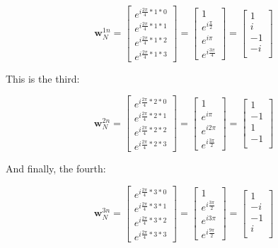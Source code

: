 \documentclass[
  letterpaper,
]{krantz}
\begin{document}
\[
\mathbf{w}^{1n}_N
=
\begin{bmatrix}
   e^{i\frac{2 \pi}{4}* 1 * 0}\\
   e^{i\frac{2 \pi}{4}* 1 * 1}\\
   e^{i\frac{2 \pi}{4}* 1 * 2}\\
   e^{i\frac{2 \pi}{4}* 1 * 3}
\end{bmatrix}
=
\begin{bmatrix}
   1\\
   e^{i\frac{\pi}{2}}\\
   e^{i \pi}\\
   e^{i\frac{3 \pi}{4}}
\end{bmatrix}
=
\begin{bmatrix}
   1\\
   i\\
   -1\\
   -i\\
\end{bmatrix}
\]

This is the third:

\[
\mathbf{w}^{2n}_N
=
\begin{bmatrix}
   e^{i\frac{2 \pi}{4}* 2 * 0}\\
   e^{i\frac{2 \pi}{4}* 2 * 1}\\
   e^{i\frac{2 \pi}{4}* 2 * 2}\\
   e^{i\frac{2 \pi}{4}* 2 * 3}
\end{bmatrix}
=
\begin{bmatrix}
   1\\
   e^{i\pi}\\
   e^{i 2 \pi}\\
   e^{i\frac{3 \pi}{2}}
\end{bmatrix}
=
\begin{bmatrix}
   1\\
   -1\\
   1\\
   -1\\
\end{bmatrix}
\]

And finally, the fourth:

\[
\mathbf{w}^{3n}_N
=
\begin{bmatrix}
   e^{i\frac{2 \pi}{4}* 3 * 0}\\
   e^{i\frac{2 \pi}{4}* 3 * 1}\\
   e^{i\frac{2 \pi}{4}* 3 * 2}\\
   e^{i\frac{2 \pi}{4}* 3 * 3}
\end{bmatrix}
=
\begin{bmatrix}
   1\\
   e^{i\frac{3 \pi}{2}}\\
   e^{i 3 \pi}\\
   e^{i\frac{9 \pi}{2}}
\end{bmatrix}
=
\begin{bmatrix}
   1\\
   -i\\
   -1\\
   i\\
\end{bmatrix}
\]
\end{document}
